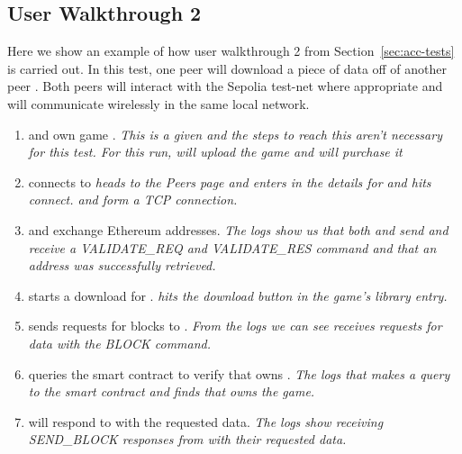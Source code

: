 \subsection*{User Walkthrough 2}\label{app:acc-test}

Here we show an example of how user walkthrough 2 from Section~\ref{sec:acc-tests} is carried out. In this test, one peer  will download a piece of data  off of another peer . Both peers will interact with the Sepolia test-net where appropriate and will communicate wirelessly in the same local network.

\begin{enumerate}
  \item {} and  own game .
  \newline\textit{This is a given and the steps to reach this aren't necessary for this test. For this run,  will upload the game and  will purchase it}

  \item {} connects to 
  \newline\textit{ heads to the Peers page and enters in the details for  and hits connect.  and  form a TCP connection.}
  
  \item {} and  exchange Ethereum addresses.
  \newline\textit{The logs show us that both  and  send and receive a VALIDATE\_REQ and VALIDATE\_RES command and that an address was successfully retrieved.}
  
  \item {} starts a download for .
  \newline\textit{ hits the download button in the game's library entry. }

  \item {} sends requests for blocks to .
  \newline\textit{From the logs we can see  receives requests for data with the BLOCK command.}

  \item {} queries the smart contract to verify that  owns .
  \newline\textit{The logs that  makes a query to the smart contract and finds that  owns the game.}
  
  \item {} will respond to  with the requested data.
  \newline\textit{The logs show  receiving SEND\_BLOCK responses from  with their requested data.}


\end{enumerate}
